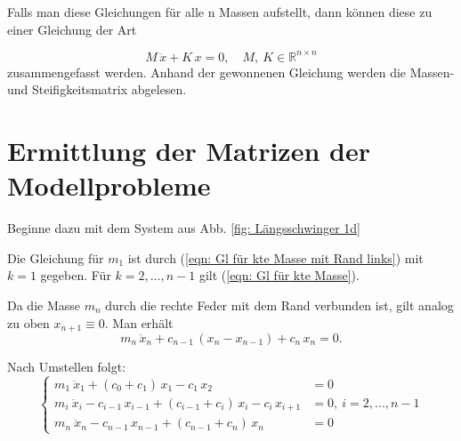 \documentclass[a4paper,12pt]{report}
\newcommand{\R}{\mathbb R}
\theoremstyle{plain} %
\theoremstyle{definition} %
\theoremstyle{remark}
\begin{document}
            Falls man diese Gleichungen für alle n Massen aufstellt, dann können diese zu einer Gleichung der Art

            \begin{equation}
                  \label{eqn: MK Gleichung in 1D}
                  M\,\ddot x + K\,x = 0,\quad M,\ K\in\R^{n\times n}
            \end{equation}
            zusammengefasst werden. Anhand der gewonnenen Gleichung werden die Massen- und Steifigkeitsmatrix abgelesen.


            
      \section{Ermittlung der Matrizen der Modellprobleme}
            Beginne dazu mit dem System aus Abb. \ref{fig: Längsschwinger 1d}

            Die Gleichung für $m_1$ ist durch (\ref{eqn: Gl für kte Masse mit Rand links}) mit $k=1$ gegeben.
            Für $k=2,\dots, n-1$ gilt (\ref{eqn: Gl für kte Masse}).
            
            Da die Masse $m_n$ durch die rechte Feder mit dem Rand verbunden ist, gilt analog zu oben $x_{n+1} \equiv 0$.
            Man erhält
            $$m_n\,\ddot x_n + c_{n-1}\,(x_n-x_{n-1}) + c_n\,x_n = 0.$$  

            Nach Umstellen folgt:
            \begin{equation}
                  \label{eqn: System GDgl MK 1d}
                  \begin{cases}
                        m_1\ \ddot x_1 + (c_0+c_1)\,x_1 - c_1\,x_2 & = 0   \\
                        m_i\ \ddot x_i - c_{i-1}\,x_{i-1} + (c_{i-1}+c_i)\,x_i -c_i\,x_{i+1} & = 0,\ i=2,...,n-1 \\
                        m_n\ \ddot x_n - c_{n-1}\,x_{n-1} + (c_{n-1}+c_n)\,x_n & = 0
                  \end{cases}
            \end{equation}
\end{document}
